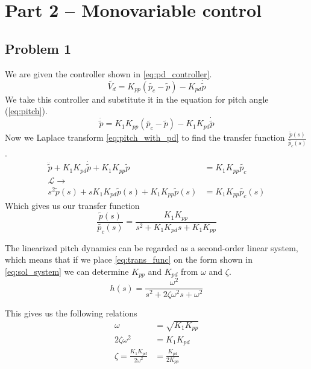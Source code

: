 
\section{Part 2 -- Monovariable control}
\subsection{Problem 1}
We are given the controller shown in \cref{eq:pd_controller}.
\begin{equation}
  \label{eq:pd_controller}
  \tilde{V_d} = K_{pp}(\tilde{p_c} - \tilde{p}) - K_{pd} \dot{\tilde{p}}
\end {equation}
We take this controller and substitute it in the equation for pitch
angle (\cref{eq:pitch}).
\begin{equation}
  \label{eq:pitch_with_pd}
  \ddot{\tilde{p}} = K_1 K_{pp}(\tilde{p_c} - \tilde{p}) - K_1 K_{pd}
  \dot{\tilde{p}}
\end{equation}
Now we Laplace transform \cref{eq:pitch_with_pd} to find the transfer
function $\frac{\tilde{p}(s)}{\tilde{p_c}(s)}$.
\begin{align*}
  \ddot{\tilde{p}} + K_1 K_{pd}\dot{\tilde{p}}
  + K_1K_{pp}\tilde{p} &= K_1 K_{pp}\tilde{p_c} \\
  \mathcal{L}\rightarrow&  \\
  s^2\tilde{p}(s) + sK_1K_{pd}\tilde{p}(s)
  + K_1K_{pp}\tilde{p}(s) &= K_1K_{pp}\tilde{p_c}(s)
\end{align*}
Which gives us our transfer function
\begin{equation}
  \label{eq:trans_func}
  \frac{\tilde{p}(s)}{\tilde{p_c}(s)} = \frac{K_1K_{pp}}{s^2+K_1K_{pd}s+K_1K_{pp}}
\end{equation}

The linearized pitch dynamics can be regarded as a second-order linear
system, which means that if we place \cref{eq:trans_func} on the form
shown in \cref{eq:sol_system} we can determine $K_{pp}$ and $K_{pd}$
from $\omega$ and $\zeta$.
\begin{equation}
  \label{eq:sol_system}
  h(s) = \frac{\omega^2}{s^2+2\zeta\omega^2s+\omega^2}
\end{equation}

This gives us the following relations
\begin{align}
  \label{eq:omega}
  \omega &= \sqrt{K_ 1K_ {pp}} \\
  2\zeta\omega^2 &= K_ 1K_ {pd} \nonumber \\
  \label{eq:zeta}
  \zeta = \frac{K_ 1K_ {pd}}{2\omega^2} &= \frac{K_{pd}}{2K_{pp}}
\end{align}


